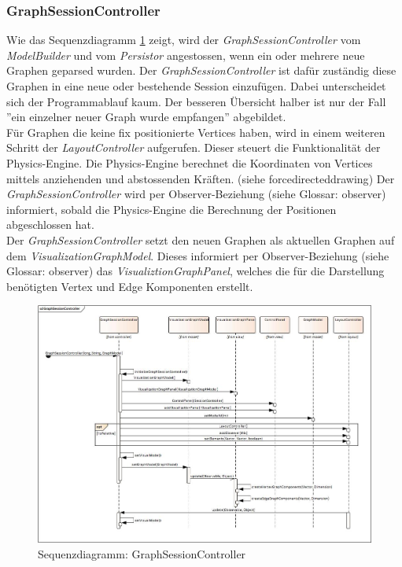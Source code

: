 \documentclass[11pt,a4paper,english,oneside]{book}
\numberwithin{equation}{chapter}
\begin{document}
	\clearpage

	\subsubsection{GraphSessionController} \label{sssec:sessioncontroller}
	Wie das Sequenzdiagramm \ref{fig:sd-graphsessioncontroller} zeigt, wird der \textit{GraphSessionController} vom \textit{ModelBuilder} und vom \textit{Persistor} angestossen, wenn ein oder mehrere neue Graphen geparsed wurden. Der \textit{GraphSessionController} ist dafür zuständig diese Graphen in eine neue oder bestehende Session einzufügen. Dabei unterscheidet sich der Programmablauf kaum. Der besseren Übersicht halber ist nur der Fall ''ein einzelner neuer Graph wurde empfangen'' abgebildet.\\
	Für Graphen die keine fix positionierte Vertices haben, wird in einem weiteren Schritt der \textit{LayoutController} aufgerufen. Dieser steuert die Funktionalität der Physics-Engine. Die Physics-Engine berechnet die Koordinaten von Vertices mittels anziehenden und abstossenden Kräften. (siehe \gls{forcedirecteddrawing}) Der \textit{GraphSessionController} wird  per Observer-Beziehung (siehe Glossar: \gls{observer}) informiert, sobald die Physics-Engine die Berechnung der Positionen abgeschlossen hat.\\
	Der \textit{GraphSessionController} setzt den neuen Graphen als aktuellen Graphen auf dem \textit{VisualizationGraphModel}. Dieses informiert per Observer-Beziehung (siehe Glossar: \gls{observer}) das \textit{VisualiztionGraphPanel}, welches die für die Darstellung benötigten Vertex und Edge Komponenten erstellt.
	\begin{figure}[h!]
		\centering
		\includegraphics[width=\linewidth]{assets/images/graph_session_controller}
		\caption{Sequenzdiagramm: GraphSessionController}
		\label{fig:sd-graphsessioncontroller}
	\end{figure}
\end{document}
